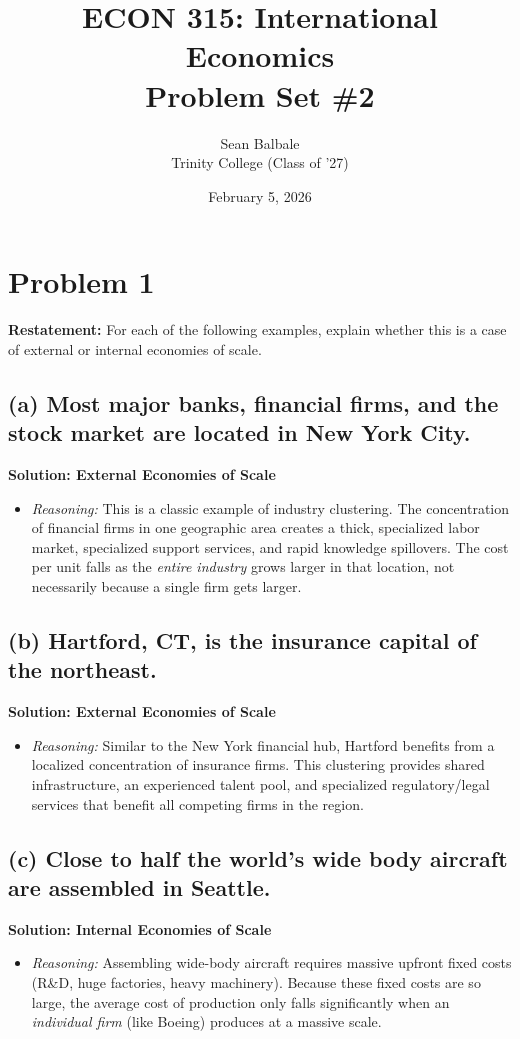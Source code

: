 \documentclass[11pt, letterpaper]{article}
\title{\textbf{ECON 315: International Economics \\ Problem Set \#2}}
\author{Sean Balbale \\ Trinity College (Class of '27)}
\date{February 5, 2026}
\begin{document}
\maketitle

\section*{Problem 1}

\textbf{Restatement:} For each of the following examples, explain whether this is a case of external or internal economies of scale.

\subsection*{(a) Most major banks, financial firms, and the stock market are located in New York City.}
\noindent \textbf{Solution: External Economies of Scale}
\begin{itemize}
  \item \textit{Reasoning:} This is a classic example of industry clustering. The concentration of financial firms in one geographic area creates a thick, specialized labor market, specialized support services, and rapid knowledge spillovers. The cost per unit falls as the \textit{entire industry} grows larger in that location, not necessarily because a single firm gets larger.
\end{itemize}

\subsection*{(b) Hartford, CT, is the insurance capital of the northeast.}
\noindent \textbf{Solution: External Economies of Scale}
\begin{itemize}
  \item \textit{Reasoning:} Similar to the New York financial hub, Hartford benefits from a localized concentration of insurance firms. This clustering provides shared infrastructure, an experienced talent pool, and specialized regulatory/legal services that benefit all competing firms in the region.
\end{itemize}

\subsection*{(c) Close to half the world's wide body aircraft are assembled in Seattle.}
\noindent \textbf{Solution: Internal Economies of Scale}
\begin{itemize}
  \item \textit{Reasoning:} Assembling wide-body aircraft requires massive upfront fixed costs (R\&D, huge factories, heavy machinery). Because these fixed costs are so large, the average cost of production only falls significantly when an \textit{individual firm} (like Boeing) produces at a massive scale.
\end{itemize}
\end{document}
